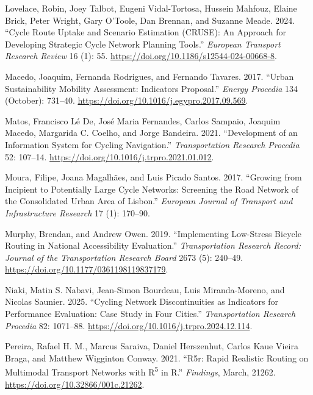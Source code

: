 \documentclass[
  sn-nature,
]{sn-jnl}
\newlength{\cslhangindent}
\newenvironment{CSLReferences}[2] %
 {\begin{list}{}{%
  \setlength{\itemindent}{0pt}
  \setlength{\leftmargin}{0pt}
  \setlength{\parsep}{0pt}
  \ifodd #1
   \setlength{\leftmargin}{\cslhangindent}
   \setlength{\itemindent}{-1\cslhangindent}
  \fi
  \setlength{\itemsep}{#2\baselineskip}}}
 {\end{list}}
\begin{document}
\begin{CSLReferences}{1}{0}
Lovelace, Robin, Joey Talbot, Eugeni Vidal-Tortosa, Hussein Mahfouz,
Elaine Brick, Peter Wright, Gary O'Toole, Dan Brennan, and Suzanne
Meade. 2024. {``Cycle Route Uptake and Scenario Estimation (CRUSE): An
Approach for Developing Strategic Cycle Network Planning Tools.''}
\emph{European Transport Research Review} 16 (1): 55.
\url{https://doi.org/10.1186/s12544-024-00668-8}.

Macedo, Joaquim, Fernanda Rodrigues, and Fernando Tavares. 2017.
{``Urban Sustainability Mobility Assessment: Indicators Proposal.''}
\emph{Energy Procedia} 134 (October): 731--40.
\url{https://doi.org/10.1016/j.egypro.2017.09.569}.

Matos, Francisco Lé De, José Maria Fernandes, Carlos Sampaio, Joaquim
Macedo, Margarida C. Coelho, and Jorge Bandeira. 2021. {``Development of
an Information System for Cycling Navigation.''} \emph{Transportation
Research Procedia} 52: 107--14.
\url{https://doi.org/10.1016/j.trpro.2021.01.012}.

Moura, Filipe, Joana Magalhães, and Luis Picado Santos. 2017. {``Growing
from Incipient to Potentially Large Cycle Networks: Screening the Road
Network of the Consolidated Urban Area of Lisbon.''} \emph{European
Journal of Transport and Infrastructure Research} 17 (1): 170--90.

Murphy, Brendan, and Andrew Owen. 2019. {``Implementing Low-Stress
Bicycle Routing in National Accessibility Evaluation.''}
\emph{Transportation Research Record: Journal of the Transportation
Research Board} 2673 (5): 240--49.
\url{https://doi.org/10.1177/0361198119837179}.

Niaki, Matin S. Nabavi, Jean-Simon Bourdeau, Luis Miranda-Moreno, and
Nicolas Saunier. 2025. {``Cycling Network Discontinuities as Indicators
for Performance Evaluation: Case Study in Four Cities.''}
\emph{Transportation Research Procedia} 82: 1071--88.
\url{https://doi.org/10.1016/j.trpro.2024.12.114}.

Pereira, Rafael H. M., Marcus Saraiva, Daniel Herszenhut, Carlos Kaue
Vieira Braga, and Matthew Wigginton Conway. 2021. {``R5r: Rapid
Realistic Routing on Multimodal Transport Networks with
R{\textsuperscript{5}} in R.''} \emph{Findings}, March, 21262.
\url{https://doi.org/10.32866/001c.21262}.


\end{CSLReferences}
\end{document}
